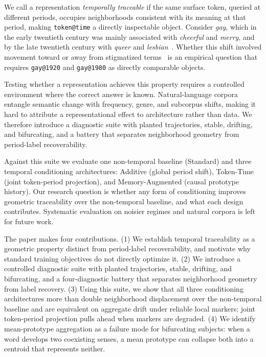 \documentclass[runningheads]{llncs}
\begin{document}
We call a representation \emph{temporally traceable} if the same surface token, queried at different periods, occupies neighborhoods consistent with its meaning at that period, making \texttt{token@time} a directly inspectable object. Consider \emph{gay}, which in the early twentieth century was mainly associated with \emph{cheerful} and \emph{merry}, and by the late twentieth century with \emph{queer} and \emph{lesbian}~\cite{hamilton2016diachronic}. Whether this shift involved movement toward or away from stigmatized terms~\cite{hamilton2016diachronic} is an empirical question that requires \texttt{gay@1920} and \texttt{gay@1980} as directly comparable objects.

Testing whether a representation achieves this property requires a controlled environment where the correct answer is known. Natural-language corpora entangle semantic change with frequency, genre, and subcorpus shifts, making it hard to attribute a representational effect to architecture rather than data. We therefore introduce a diagnostic suite with planted trajectories, stable, drifting, and bifurcating, and a battery that separates neighborhood geometry from period-label recoverability.

Against this suite we evaluate one non-temporal baseline (Standard) and three
temporal conditioning architectures: Additive (global period shift), Token-Time
(joint token-period projection), and Memory-Augmented (causal prototype history).
Our research question is whether any form of conditioning improves geometric
traceability over the non-temporal baseline, and what each design contributes.
Systematic evaluation on noisier regimes and natural corpora is left for future work.

The paper makes four contributions. (1) We establish temporal traceability as a geometric property distinct from period-label recoverability, and motivate why standard training objectives do not directly optimize it. (2) We introduce a controlled diagnostic suite with planted trajectories, stable, drifting, and bifurcating, and a four-diagnostic battery that separates neighborhood geometry from label recovery. (3) Using this suite, we show that all three conditioning architectures more than double neighborhood displacement over the non-temporal baseline and are equivalent on aggregate drift under reliable local markers; joint token-period projection pulls ahead when markers are degraded. (4) We identify mean-prototype aggregation as a failure mode for bifurcating subjects: when a word develops two coexisting senses, a mean prototype can collapse both into a centroid that represents neither.
\end{document}
